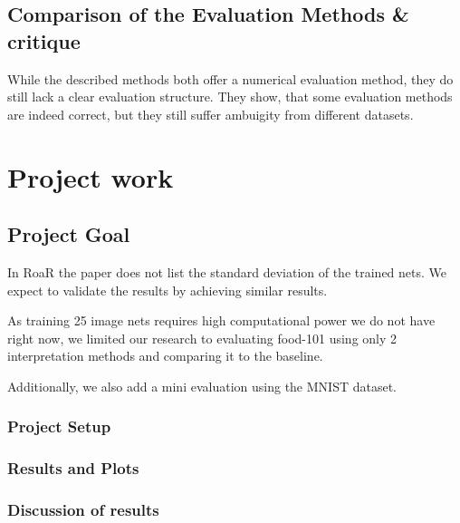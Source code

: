 \section{Comparison of the Evaluation Methods \& critique}

While the described methods both offer a numerical evaluation method, they do still lack a clear evaluation structure. They show, that some evaluation methods are indeed correct, but they still suffer ambuigity from different datasets.




\chapter{Project work} %


\section{Project Goal}
In RoaR\cite{hooker2019benchmark} the paper does not list the standard deviation of the trained nets. We expect to validate the results by achieving similar results.

As training 25 image nets requires high computational power we do not have right now, we limited our research to evaluating food-101 \cite{bossard14} using only 2 interpretation methods and comparing it to the baseline.


Additionally, we also add a mini evaluation using the MNIST dataset.



\subsection{Project Setup}




\subsection{Results and Plots}

\subsection{Discussion of results}






